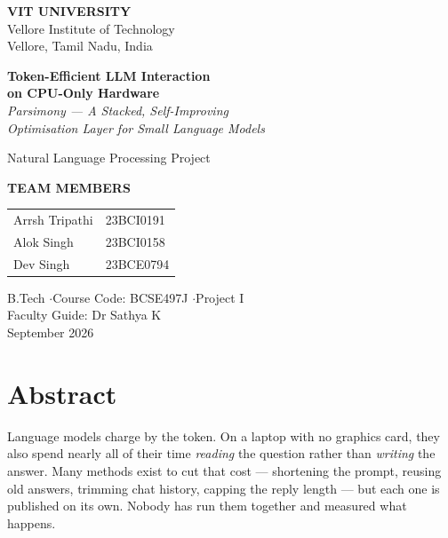 \documentclass[11pt,a4paper]{article}
\begin{document}
\thispagestyle{empty}
\begin{center}
  \vspace*{1.2cm}
  {\large\bfseries VIT UNIVERSITY}\\[2pt]
  {\small Vellore Institute of Technology}\\[1pt]
  {\small Vellore, Tamil Nadu, India}

  \vspace{2.6cm}
  {\huge\bfseries Token-Efficient LLM Interaction\\[4pt] on CPU-Only Hardware}\\[10pt]
  {\large\itshape Parsimony --- A Stacked, Self-Improving\\ Optimisation Layer for Small Language Models}

  \vspace{1.6cm}
  {\normalsize Natural Language Processing Project}

  \vspace{1.4cm}
  {\small\textcolor{accent}{\textbf{TEAM MEMBERS}}}\\[8pt]
  \begin{tabular}{ll}
    Arrsh Tripathi & 23BCI0191 \\
    Alok Singh     & 23BCI0158 \\
    Dev Singh      & 23BCE0794 \\
  \end{tabular}

  \vspace{1.8cm}
  {\small B.Tech \quad$\cdot$\quad Course Code: BCSE497J \quad$\cdot$\quad Project I}\\[4pt]
  {\small Faculty Guide: Dr Sathya K}\\[4pt]
  {\small September 2026}
\end{center}
\newpage

\section*{Abstract}
Language models charge by the token. On a laptop with no graphics card, they also
spend nearly all of their time \emph{reading} the question rather than
\emph{writing} the answer. Many methods exist to cut that cost --- shortening the
prompt, reusing old answers, trimming chat history, capping the reply length ---
but each one is published on its own. Nobody has run them together and measured
what happens.
\end{document}
